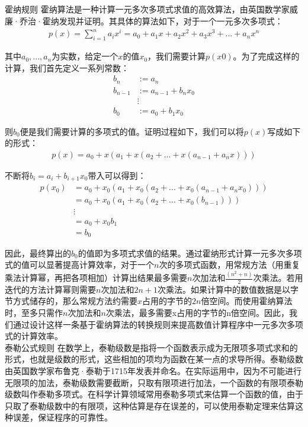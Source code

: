  {\kaishu 霍纳规则} 霍纳算法\cite{Boldo2004}是一种计算一元多次多项式求值的高效算法，由英国数学家威廉·乔治·霍纳发现并证明。其具体的算法如下，对于一个一元多次多项式：
  \begin{gather*}
    p(x) = \sum_{i=1}^{n} a_ix^i = a_0+a_1x+a_2x^2+a_3x^3+...+a_nx^n
  \end{gather*}

  其中$a_0,...,a_n$为实数，给定一个$x$的值$x_0$，我们需要计算$p(x0)$。为了完成这样的计算，我们首先定义一系列常数：
  \begin{equation*}
    \begin{split}
    b_n & := a_n \\
    b_{n-1} & := a_{n-1} + b_nx_0 \\
    & \vdots  \\
    b_0 & := a_0 + b_1x_0
    \end{split}
  \end{equation*}

  则$b_0$便是我们需要计算的多项式的值。证明过程如下，我们可以将$p(x)$写成如下的形式：
  \begin{gather*}
    p(x) = a_0+x(a_1+x(a_2+...+x(a_{n-1}+a_nx))) 
  \end{gather*}

  不断将$b_i = a_i + b_{i+1}x_0$带入可以得到：
  \begin{equation*}
    \begin{split}
    p(x_0) & = a_0+x_0(a_1+x_0(a_2+...+x_0(a_{n-1}+a_nx_0))) \\
           & = a_0+x_0(a_1+x_0(a_2+...+x_0(b_{n-1}))) \\
           & \vdots \\
           & = a_0 + x_0b_1 \\
           & = b_0
    \end{split}
  \end{equation*}

因此，最终算出的$b_0$的值即为多项式求值的结果。通过霍纳形式计算一元多次多项式的值可以显著提高计算效率，对于一个$n$次的多项式函数，用常规方法（用重复乘法计算幂，再把各项相加）计算出结果最多需要$n$次加法和$\frac{(n^{2}+n)}{2}$次乘法。若用迭代的方法计算幂则需要$n$次加法和$2n+1$次乘法。如果计算中的数值数据是以字节方式储存的，那么常规方法约需要$x$占用的字节的$2n$倍空间。而使用霍纳算法时，至多只需作$n$次加法和$n$次乘法，最多需要x占用的字节的n倍空间。因此，我们通过设计这样一条基于霍纳算法的转换规则来提高数值计算程序中一元多次多项式的计算效率。\\


{\kaishu 泰勒公式规则} 在数学上，泰勒级数\cite{Canuto2008}是指将一个函数表示成为无限项多项式求和的形式，也就是级数的形式，这些相加的项均为函数在某一点的求导所得。泰勒级数由英国数学家布鲁克·泰勒于1715年发表并命名。在实际运用中，因为不可能进行无限项的加法，泰勒级数需要截断，只取有限项进行加法，一个函数的有限项泰勒级数叫作泰勒多项式。在科学计算领域常用泰勒多项式来估算一个函数的值，由于只取了泰勒级数中的有限项，这种估算是存在误差的，可以使用泰勒定理来估算这种误差，保证程序的可靠性。

